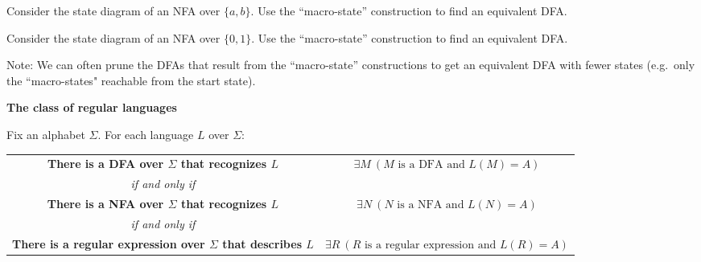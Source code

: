 \documentclass[12pt, oneside]{article}
\begin{document}
Consider the state diagram of an NFA over $\{a,b\}$. Use the ``macro-state'' construction 
to find an equivalent DFA.


\vfill

Consider the state diagram of an NFA over $\{0,1\}$. Use the ``macro-state'' construction 
to find an equivalent DFA.


\vfill

Note: We can often prune the DFAs that result from the ``macro-state'' constructions to get an 
equivalent DFA with fewer states (e.g.\ only the ``macro-states" reachable from the start state).

\newpage


{\bf The class of regular languages}

Fix an alphabet $\Sigma$. For each language $L$ over $\Sigma$:
\begin{center}
\begin{tabular}{cc}
    {\bf There is a DFA over $\Sigma$ that recognizes $L$}&$\exists M ~(M \textrm{ is a DFA and } L(M) = A)$\\
    {\it if and only if}&\\
    {\bf There is a NFA over $\Sigma$ that recognizes $L$}&$\exists N ~(N \textrm{ is a NFA and } L(N) = A)$\\
    {\it if and only if}&\\
    {\bf There is a regular expression over $\Sigma$ that describes $L$} &$\exists R ~(R \textrm{ is a regular expression and } L(R) = A)$\\
\end{tabular}
\end{center}
\end{document}
